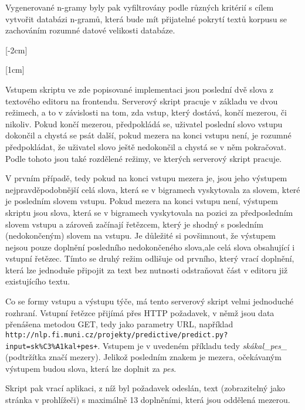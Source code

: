 \documentclass{article}
\begin{document}

Vygenerované n-gramy byly pak vyfiltrovány podle různých kritérií s cílem vytvořit databázi n-gramů, která bude mít přijatelné pokrytí textů korpusu se zachováním rozumné datové velikosti databáze.


[-2cm]

[1cm]

Vstupem skriptu ve zde popisované implementaci jsou poslední dvě slova z textového editoru na frontendu. Serverový skript pracuje v základu ve dvou režimech, a to v závislosti na tom, zda vstup, který dostává, končí mezerou, či nikoliv. Pokud končí mezerou, předpokládá se, uživatel poslední slovo vstupu dokončil a chystá se psát další, pokud mezera na konci vstupu není, je rozumné předpokládat, že uživatel slovo ještě nedokončil a chystá se v něm pokračovat. Podle tohoto jsou také rozdělené režimy, ve kterých serverový skript pracuje. 

V prvním případě, tedy pokud na konci vstupu mezera je, jsou jeho výstupem nejpravděpodobnější celá slova, která se v bigramech vyskytovala za slovem, které je posledním slovem vstupu. Pokud mezera na konci vstupu není, výstupem skriptu jsou slova, která se v bigramech vyskytovala na pozici za předposledním slovem vstupu a zároveň začínají řetězcem, který je shodný s posledním (nedokončeným) slovem na vstupu. Je důležité si povšimnout, že výstupem nejsou pouze doplnění posledního nedokončeného slova,ale celá slova obsahující i vstupní řetězec. Tímto se druhý režim odlišuje od prvního, který vrací doplnění, která lze jednoduše připojit za text bez nutnosti odstraňovat část v editoru již existujícího textu.

Co se formy vstupu a výstupu týče, má tento serverový skript velmi jednoduché rozhraní. Vstupní řetězce přijímá přes HTTP požadavek, v němž jsou data přenášena metodou GET, tedy jako parametry URL, například {\tt http://nlp.fi.muni.cz/projekty/predictive/predict.py?input=sk\%C3\%A1kal+pes+}. Vstupem je v uvedeném příkladu tedy {\it skákal\_pes\_} (podtržítka značí mezery). Jelikož posledním znakem je mezera, očekávaným výstupem budou slova, která lze doplnit za {\it pes}. 

Skript pak vrací aplikaci, z níž byl požadavek odeslán, text (zobrazitelný jako stránka v prohlížeči) s maximálně 13 doplněními, která jsou oddělená mezerou.
\end{document}
